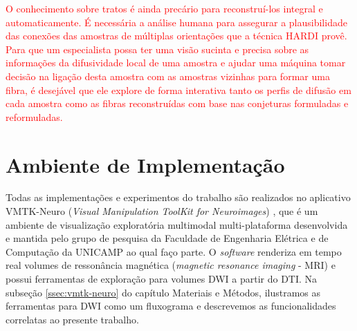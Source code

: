\documentclass[
    12pt,                %
    oneside,            %
    a4paper,            %
    english,            %
    french,                %
    spanish,            %
    brazil                %
    ]{abntex2}
\begin{document}

\textcolor{red}{O conhecimento sobre tratos é ainda precário para reconstruí-los integral e automaticamente. É necessária a análise humana para assegurar a plausibilidade das conexões das amostras de múltiplas orientações que a técnica HARDI provê. Para que um especialista possa ter uma visão sucinta e precisa sobre as informações da difusividade local de uma amostra e ajudar uma máquina tomar decisão na ligação desta amostra com as amostras vizinhas para formar uma fibra, é desejável que ele explore de forma interativa tanto os perfis de difusão em cada amostra como as fibras reconstruídas com base nas conjeturas formuladas e reformuladas.}

\section{Ambiente de Implementação}
\label{ssec:ambiente}

Todas as implementações e experimentos do trabalho são realizados no aplicativo VMTK-Neuro (\textit{Visual Manipulation ToolKit for Neuroimages}) \cite{VMTKNeuro}, que é um ambiente de visualização exploratória multimodal multi-plataforma desenvolvida e mantida pelo grupo de pesquisa da Faculdade de Engenharia Elétrica e de Computação da UNICAMP ao qual faço parte. O \textit{software} renderiza em tempo real volumes de ressonância magnética (\textit{magnetic resonance imaging} - MRI) e possui ferramentas de exploração para volumes DWI a partir do DTI. Na subseção \ref{ssec:vmtk-neuro} do capítulo Materiais e Métodos, ilustramos as ferramentas para DWI como um fluxograma e descrevemos as funcionalidades correlatas ao presente trabalho.


%
\end{document}
